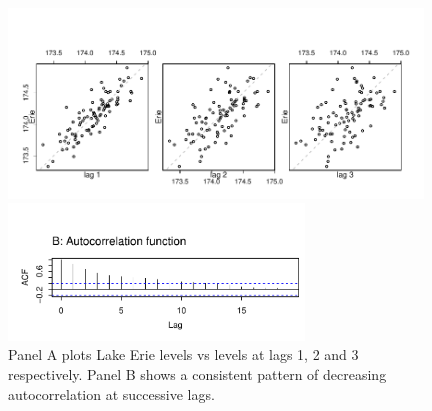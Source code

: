 \documentclass[12pt, a4paper,  BCOR=8.25mm, DIV=15]{scrartcl}\usepackage[]{graphicx}\usepackage[]{color}
\newenvironment{knitrout}{}{} %
\begin{document}
\begin{figure}
\begin{knitrout}
\color{fgcolor}

{\centering \includegraphics[width=0.98\textwidth]{figs/xmeth-lagErie-12_5-1} 

}



\end{knitrout}
\vspace*{-3pt}

\begin{knitrout}
\color{fgcolor}

{\centering \includegraphics[width=0.7\textwidth]{figs/xmeth-acfErie-1} 

}



\end{knitrout}
\caption{Panel A plots Lake Erie levels vs levels at lags 1, 2 and 3
  respectively. Panel B shows a consistent pattern of decreasing
  autocorrelation at successive lags.
}\label{erie-lagplot}
\end{figure}
\end{document}
